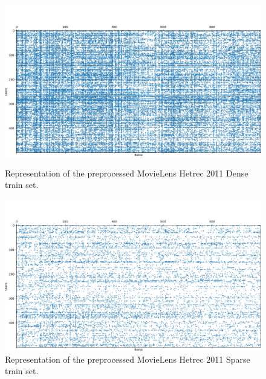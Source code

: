 \begin{figure}[htb]
\centering
\includegraphics[width=\textwidth]{pictures/movielens-dense-target}
\caption{Representation of the preprocessed MovieLens Hetrec 2011 Dense train set.}
\includegraphics[width=\textwidth]{pictures/movielens-sparse-target}
\caption{Representation of the preprocessed MovieLens Hetrec 2011 Sparse train set.}
\end{figure}



